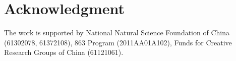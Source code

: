 \documentclass[journal]{IEEEtran}
\begin{document}
\section*{Acknowledgment}

The work is supported by National Natural Science Foundation of China (61302078, 61372108), 863 Program (2011AA01A102), Funds for Creative Research Groups of China (61121061).

%
\end{document}
